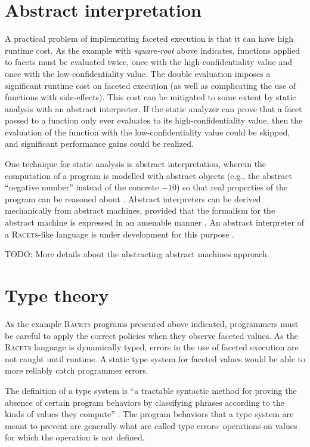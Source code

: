 \documentclass{article}
\begin{document}
\section{Abstract interpretation}
A practical problem of implementing faceted execution is that it can have high runtime cost. As the example with \textit{square-root} above indicates, functions applied to facets must be evaluated twice, once with the high-confidentiality value and once with the low-confidentiality value. The double evaluation imposes a significant runtime cost on faceted execution (as well as complicating the use of functions with side-effects). This cost can be mitigated to some extent by static analysis with an abstract interpreter. If the static analyzer can prove that a facet passed to a function only ever evaluates to its high-confidentiality value, then the evaluation of the function with the low-confidentiality value could be skipped, and significant performance gains could be realized.

One technique for static analysis is abstract interpretation, wherein the computation of a program is modelled with abstract objects (e.g., the abstract ``negative number'' instead of the concrete $-10$) so that real properties of the program can be reasoned about \cite{ai-original}. Abstract interpreters can be derived mechanically from abstract machines, provided that the formalism for the abstract machine is expressed in an amenable manner \cite{aam}. An abstract interpreter of a \textsc{Racets}-like language is under development for this purpose \cite{abstract-inter}.

TODO: More details about the abstracting abstract machines approach.

\section{Type theory}
As the example \textsc{Racets} programs presented above indicated, programmers must be careful to apply the correct policies when they observe faceted values. As the \textsc{Racets} language is dynamically typed, errors in the use of faceted execution are not caught until runtime. A static type system for faceted values would be able to more reliably catch programmer errors.

The definition of a type system is ``a tractable syntactic method for proving the absence of certain program behaviors by classifying phrases according to the kinds of values they compute'' \cite{types}. The program behaviors that a type system are meant to prevent are generally what are called type errors: operations on values for which the operation is not defined.
\end{document}
